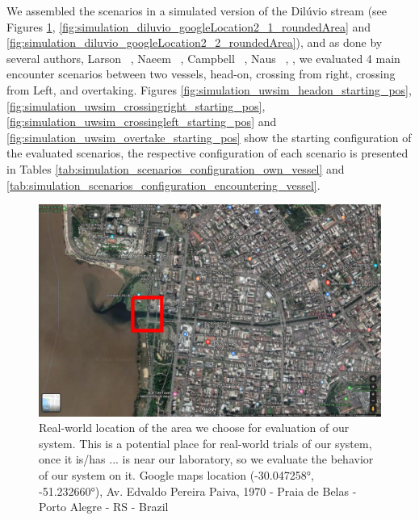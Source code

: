      We assembled the scenarios in a simulated version of the Dilúvio stream (see Figures \ref{fig:simulation_diluvio_googleLocation_roundedArea}, \ref{fig:simulation_diluvio_googleLocation2_1_roundedArea} and \ref{fig:simulation_diluvio_googleLocation2_2_roundedArea}), and as done by several authors, \eg{} Larson \etal{} ~\cite{Larson2006Autonomous}, Naeem \etal{} ~\cite{Naeem2012COLREGS}, Campbell \etal{} ~\cite{Campbell2013Automatic}, Naus ~\cite{Naus2013Idea}, \etc{}, we evaluated 4 main encounter scenarios between two vessels, head-on, crossing from right, crossing from Left, and overtaking. Figures \ref{fig:simulation_uwsim_headon_starting_pos}, \ref{fig:simulation_uwsim_crossingright_starting_pos}, \ref{fig:simulation_uwsim_crossingleft_starting_pos} and \ref{fig:simulation_uwsim_overtake_starting_pos} show the starting configuration of the evaluated scenarios, the respective configuration of each scenario is presented in Tables \ref{tab:simulation_scenarios_configuration_own_vessel} and \ref{tab:simulation_scenarios_configuration_encountering_vessel}.
    
    \begin{figure}[H]
        \centering
        \includegraphics[scale=0.3]{figs/Chap5/simulation_diluvio_googleLocation_roundedArea.png}
        \caption{Real-world location of the area we choose for evaluation of our system. This is a potential place for real-world trials of our system, once it is/has ... is near our laboratory, so we evaluate the behavior of our system on it. Google maps location (-30.047258°, -51.232660°), Av. Edvaldo Pereira Paiva, 1970 - Praia de Belas - Porto Alegre - RS - Brazil}
        \label{fig:simulation_diluvio_googleLocation_roundedArea}
    \end{figure}
    
